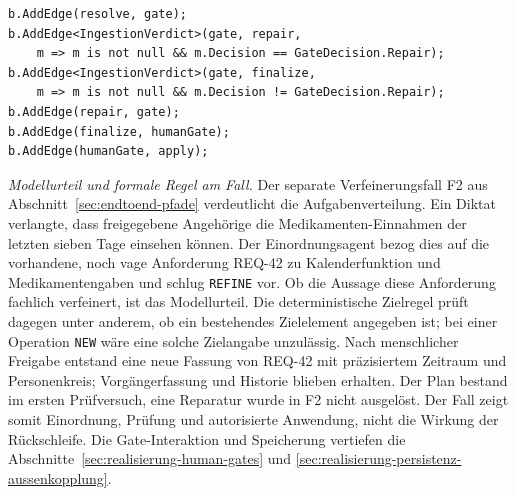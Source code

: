 \par\noindent
\begin{minipage}{\linewidth}
\lstset{
  language=[Sharp]C,
  basicstyle=\ttfamily,
  columns=fullflexible,
  keepspaces=true,
  showstringspaces=false,
  breaklines=true,
  breakatwhitespace=true
}
\begin{lstlisting}[caption={[Prüf-Reparatur-Kanten der Einordnungsstufe]Prüf-Reparatur-Kanten der Einordnungsstufe
  (gekürzter Ausschnitt aus \texttt{IngestionHitlWorkflow.cs}).},
  label={lst:gateloop-komposition}]
b.AddEdge(resolve, gate);
b.AddEdge<IngestionVerdict>(gate, repair,
    m => m is not null && m.Decision == GateDecision.Repair);
b.AddEdge<IngestionVerdict>(gate, finalize,
    m => m is not null && m.Decision != GateDecision.Repair);
b.AddEdge(repair, gate);
b.AddEdge(finalize, humanGate);
b.AddEdge(humanGate, apply);
\end{lstlisting}
\end{minipage}
\par\medskip

\emph{Modellurteil und formale Regel am Fall.} Der separate
Verfeinerungsfall F2 aus Abschnitt~\ref{sec:endtoend-pfade}
verdeutlicht die Aufgabenverteilung. Ein Diktat verlangte, dass
freigegebene Angehörige die Medikamenten-Einnahmen der letzten
sieben Tage einsehen können. Der Einordnungsagent bezog dies auf
die vorhandene, noch vage Anforderung REQ-42 zu Kalenderfunktion
und Medikamentengaben und schlug \texttt{REFINE} vor. Ob die
Aussage diese Anforderung fachlich verfeinert, ist das
Modellurteil. Die deterministische Zielregel prüft dagegen unter
anderem, ob ein bestehendes Zielelement angegeben ist; bei einer
Operation \texttt{NEW} wäre eine solche Zielangabe unzulässig.
Nach menschlicher Freigabe entstand eine neue Fassung von REQ-42
mit präzisiertem Zeitraum und Personenkreis; Vorgängerfassung und
Historie blieben erhalten. Der Plan bestand im ersten Prüfversuch,
eine Reparatur wurde in F2 nicht ausgelöst. Der Fall zeigt somit
Einordnung, Prüfung und autorisierte Anwendung, nicht die Wirkung
der Rückschleife. Die Gate-Interaktion und Speicherung vertiefen
die Abschnitte~\ref{sec:realisierung-human-gates} und
\ref{sec:realisierung-persistenz-aussenkopplung}.

